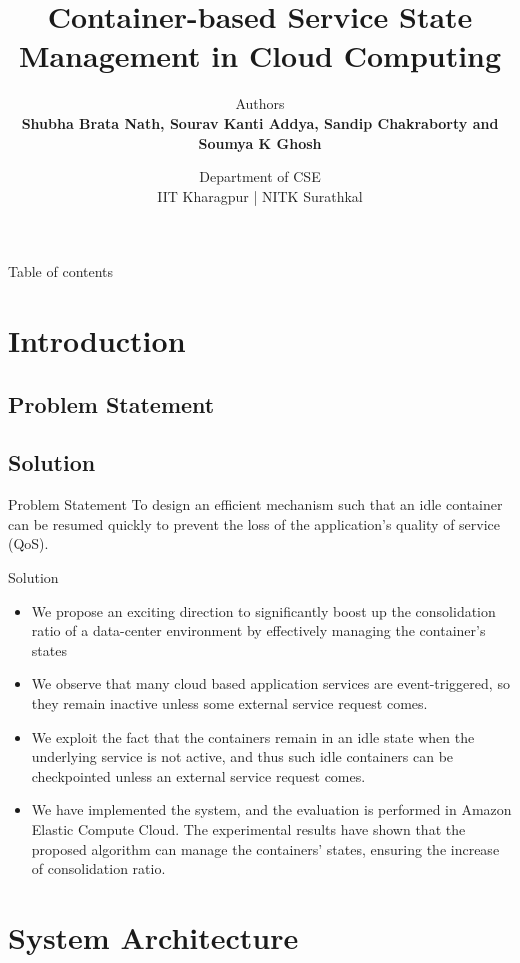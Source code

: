 \documentclass[UKenglish]{beamer}
\author{\small Department of CSE \\ IIT Kharagpur | NITK Surathkal }
\title{Container-based Service State Management in
Cloud Computing}
\subtitle{\small Authors \\ \textbf{Shubha Brata Nath, Sourav Kanti Addya, Sandip Chakraborty and Soumya K Ghosh} }
\begin{document}
%
%
\begin{frame}{Table of contents}
    \tableofcontents[]
\end{frame}



\section{Introduction}
\SectionPage
\subsection{Problem Statement}
\subsection{Solution}
\begin{frame}{Problem Statement}
\vspace{70pt}
To design an efficient mechanism
such that an idle container can be resumed quickly to prevent
the loss of the application’s quality of service (QoS).
\end{frame}
\begin{frame}{Solution}
    \begin{itemize}
\item We propose an exciting direction to significantly boost up the
consolidation ratio of a data-center environment by effectively
managing the container's states
\item We observe that many cloud based application services are event-triggered, so they remain
inactive unless some external service request comes.
\item  We exploit
the fact that the containers remain in an idle state when the
underlying service is not active, and thus such idle containers
can be checkpointed unless an external service request comes.
\item We have
implemented the system, and the evaluation is performed in
Amazon Elastic Compute Cloud. The experimental results have
shown that the proposed algorithm can manage the containers’
states, ensuring the increase of consolidation ratio.
\end{itemize}
\end{frame}

\section{System Architecture}
\SectionPage
\end{document}
